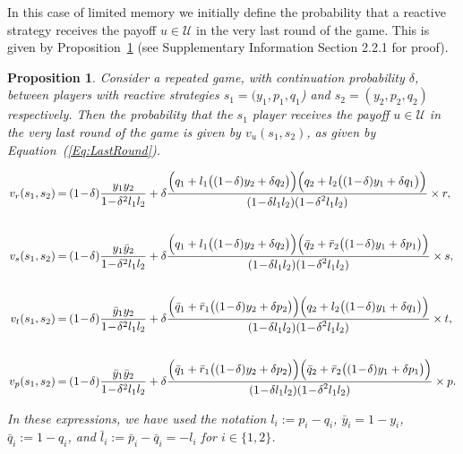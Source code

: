 \documentclass[11pt]{article}
\theoremstyle{plainCl1}
\newtheorem{Prop}{Proposition}
\theoremstyle{plainCl2}
\begin{document}
In this case of limited memory we initially define the probability that a
reactive strategy receives the payoff $u\!\in\! \mathcal{U}$ in the very last
round of the game. This is given by Proposition~\ref{proposition:last_round}
(see Supplementary Information Section 2.2.1 for proof).

\begin{Prop}\label{proposition:last_round} Consider a repeated game, with
continuation probability $\delta$, between players with reactive strategies
$s_1\!=\!(y_1, p_1, q_1$)  and $s_2\!=\!(y_2,p_2,q_2)$ respectively. Then
the probability that the $s_1$ player receives the payoff $u\!\in\!
\mathcal{U}$ in the very last round of the game is given by
$v_{u}(s_1,s_2)$, as given by Equation~(\ref{Eq:LastRound}).

\begin{equation} \label{Eq:LastRound}
  \setlength{\arraycolsep}{1pt}
  \begin{array}{rcl}

  v_{r}(s_1,s_2) &= &\displaystyle (1\!-\!\delta)\frac{y_1y_2}{1\!-\!\delta^2 l_1 l_2}+\delta \frac{\Big(q_1+l_1\big((1\!-\!\delta)y_2+\delta q_2\big)\Big) \Big(q_2+l_2\big((1\!-\!\delta)y_1+\delta q_1\big)\Big)}
  {\displaystyle(1\!-\!\delta l_1l_2)(1\!-\!\delta^2 l_1 l_2)} \times r,\\[1cm]

  v_{s}(s_1,s_2) &= &\displaystyle (1\!-\!\delta)\frac{y_1\bar{y}_2}{1\!-\!\delta^2 l_1 l_2}+\delta \frac{\Big(q_1+l_1\big((1\!-\!\delta)y_2+\delta q_2\big)\Big) \Big(\bar{q}_2+\bar{r}_2\big((1\!-\!\delta)y_1+\delta p_1\big)\Big)}
  {\displaystyle(1\!-\!\delta l_1l_2)(1\!-\!\delta^2 l_1 l_2)} \times s,\\[1cm]

  v_{t}(s_1,s_2) &= &\displaystyle (1\!-\!\delta)\frac{\bar{y}_1y_2}{1\!-\!\delta^2 l_1 l_2}+\delta \frac{\Big(\bar{q}_1+\bar{r}_1\big((1\!-\!\delta)y_2+\delta p_2\big)\Big) \Big(q_2+l_2\big((1\!-\!\delta)y_1+\delta q_1\big)\Big)}
  {\displaystyle(1\!-\!\delta l_1l_2)(1\!-\!\delta^2 l_1 l_2)} \times t,\\[1cm]

  v_{p}(s_1,s_2) &= &\displaystyle (1\!-\!\delta)\frac{\bar{y}_1\bar{y}_2}{1\!-\!\delta^2 l_1 l_2}+\delta \frac{\Big(\bar{q}_1+\bar{r}_1\big((1\!-\!\delta)y_2+\delta p_2\big)\Big) \Big(\bar{q}_2+\bar{r}_2\big((1\!-\!\delta)y_1+\delta p_1\big)\Big)}
  {\displaystyle(1\!-\!\delta l_1l_2)(1\!-\!\delta^2 l_1 l_2)} \times p.
  \end{array}
\end{equation}

In these expressions, we have used the notation $l_i:=p_i\!-\!q_i$,
$\bar{y}_i\!=\!1\!-\!y_i$, $\bar{q}_i:=1\!-\!q_i$, and
$\bar{l}_i:=\bar{p}_i\!-\!\bar{q}_i=-l_i$ for $i\!\in\!\{1,2\}$.
\end{Prop}
\end{document}
